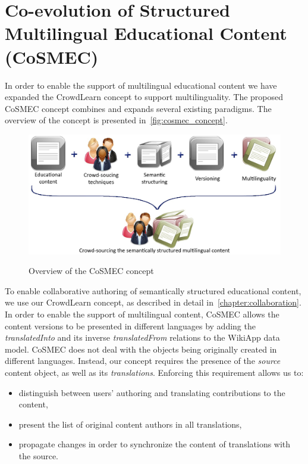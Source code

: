\documentclass[ngerman,UKenglish,table]{scrbook}
\begin{document}
\section{Co-evolution of Structured Multilingual Educational Content (CoSMEC)}
\label{sec:multilinguality}
In order to enable the support of multilingual educational content we have expanded the CrowdLearn concept to support multilinguality.
The proposed CoSMEC concept combines and expands several existing paradigms.
The overview of the concept is presented in~\autoref{fig:cosmec_concept}.

\begin{figure}[!h]
\centering
\includegraphics[width=1\textwidth]{images/CoSMEC_concept.jpg}\\
\caption{Overview of the CoSMEC concept}
\label{fig:cosmec_concept}
\end{figure}

To enable collaborative authoring of semantically structured educational content, we use our CrowdLearn concept, as described in detail in~\autoref{chapter:collaboration}.
In order to enable the support of multilingual content, CoSMEC allows the content versions to be presented in different languages by adding the \emph{translatedInto} and its inverse \emph{translatedFrom} relations to the WikiApp data model.
CoSMEC does not deal with the objects being originally created in different languages.
Instead, our concept requires the presence of the \emph{source} content object, as well as its \emph{translations}.
Enforcing this requirement allows us to:
\begin{itemize}
\item distinguish between users' authoring and translating contributions to the content,
\item present the list of original content authors in all translations,
\item propagate changes in order to synchronize the content of translations with the source.
\end{itemize}  
\end{document}
